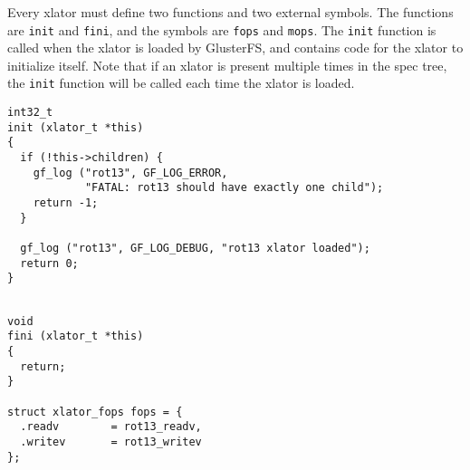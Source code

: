 \documentclass{book}[12pt]
\begin{document}
Every xlator must define two functions and two external symbols. The functions are
\texttt{init} and \texttt{fini}, and the symbols are \texttt{fops} and \texttt{mops}.
The \texttt{init} function is called when the xlator is loaded by GlusterFS, and
contains code for the xlator to initialize itself. Note that if an xlator is present
multiple times in the spec tree, the \texttt{init} function will be called each time
the xlator is loaded.

\begin{verbatim}
int32_t
init (xlator_t *this)
{
  if (!this->children) {
    gf_log ("rot13", GF_LOG_ERROR,
            "FATAL: rot13 should have exactly one child");
    return -1;
  }

  gf_log ("rot13", GF_LOG_DEBUG, "rot13 xlator loaded");
  return 0;
}
\end{verbatim}

\begin{verbatim}

void
fini (xlator_t *this)
{
  return;
}

struct xlator_fops fops = {
  .readv        = rot13_readv,
  .writev       = rot13_writev
};


\end{verbatim}
\end{document}
